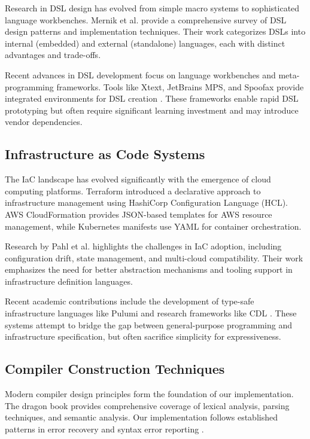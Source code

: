 \documentclass[journal,twocolumn,10pt]{IEEEtran}
\begin{document}
Research in DSL design has evolved from simple macro systems to sophisticated language workbenches. Mernik et al. \cite{mernik_2005} provide a comprehensive survey of DSL design patterns and implementation techniques. Their work categorizes DSLs into internal (embedded) and external (standalone) languages, each with distinct advantages and trade-offs.

Recent advances in DSL development focus on language workbenches and meta-programming frameworks. Tools like Xtext, JetBrains MPS, and Spoofax provide integrated environments for DSL creation \cite{voelter_2013}. These frameworks enable rapid DSL prototyping but often require significant learning investment and may introduce vendor dependencies.

\subsection{Infrastructure as Code Systems}

The IaC landscape has evolved significantly with the emergence of cloud computing platforms. Terraform \cite{terraform} introduced a declarative approach to infrastructure management using HashiCorp Configuration Language (HCL). AWS CloudFormation \cite{cloudformation} provides JSON-based templates for AWS resource management, while Kubernetes manifests use YAML for container orchestration.

Research by Pahl et al. \cite{pahl_2019} highlights the challenges in IaC adoption, including configuration drift, state management, and multi-cloud compatibility. Their work emphasizes the need for better abstraction mechanisms and tooling support in infrastructure definition languages.

Recent academic contributions include the development of type-safe infrastructure languages like Pulumi \cite{pulumi} and research frameworks like CDL \cite{cdl_2020}. These systems attempt to bridge the gap between general-purpose programming and infrastructure specification, but often sacrifice simplicity for expressiveness.

\subsection{Compiler Construction Techniques}

Modern compiler design principles form the foundation of our implementation. The dragon book \cite{aho_2006} provides comprehensive coverage of lexical analysis, parsing techniques, and semantic analysis. Our implementation follows established patterns in error recovery and syntax error reporting \cite{graham_1995}.
\end{document}
